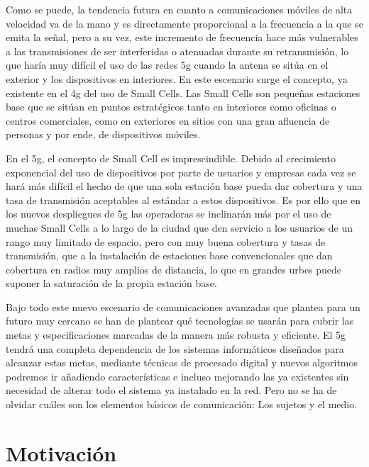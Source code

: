 \par Como se puede, la tendencia futura en cuanto a comunicaciones móviles de alta velocidad va de la mano y es directamente proporcional a la frecuencia a la que se emita la señal, pero a su vez, este incremento de frecuencia hace más vulnerables a las transmisiones de ser interferidas o atenuadas durante su retransmisión, lo que haría muy difícil el uso de las redes \gls{5g} cuando la antena se sitúa en el exterior y los dispositivos en interiores. En este escenario surge el concepto, ya existente en el \gls{4g} del uso de Small Cells. Las Small Cells son pequeñas estaciones base que se sitúan en puntos estratégicos tanto en interiores como oficinas o centros comerciales, como en exteriores en sitios con una gran afluencia de personas y por ende, de dispositivos móviles. 
\\
\par En el \gls{5g}, el concepto de Small Cell es imprescindible. Debido al crecimiento exponencial del uso de dispositivos por parte de usuarios y empresas cada vez se hará más difícil el hecho de que una sola estación base pueda dar cobertura y una tasa de transmisión aceptables al estándar a estos dispositivos. Es por ello que en los nuevos despliegues de \gls{5g} las operadoras se inclinarán más por el uso de muchas Small Cells a lo largo de la ciudad que den servicio a los usuarios de un rango muy limitado de espacio, pero con muy buena cobertura y tasas de transmisión, que a la instalación de estaciones base convencionales que dan cobertura en radios muy amplios de distancia, lo que en grandes urbes puede suponer la saturación de la propia estación base.
\\
\par Bajo todo este nuevo escenario de comunicaciones avanzadas que plantea para un futuro muy cercano se han de plantear qué tecnologías se usarán para cubrir las metas y especificaciones marcadas de la manera más robusta y eficiente. El \gls{5g} tendrá una completa dependencia de los sistemas informáticos diseñados para alcanzar estas metas, mediante técnicas de procesado digital y nuevos algoritmos podremos ir añadiendo características e incluso mejorando las ya existentes sin necesidad de alterar todo el sistema ya instalado en la red. Pero no se ha de olvidar cuáles son los elementos básicos de comunicación: Los sujetos y el medio.

\section{Motivación}



